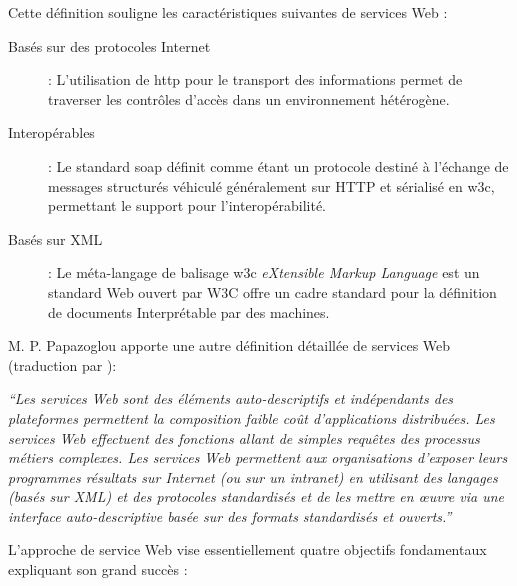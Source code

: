   Cette définition souligne les caractéristiques suivantes de services
  Web \cite{fremantle2002enterprise}:

  \renewcommand{\descriptionlabel}[1]{\hspace{0.5cm}\textbullet~\textsf{#1}}
  \begin{description}
  \item[Basés sur des protocoles Internet]: L'utilisation de
    \acrshort{http} pour le transport des informations permet de
    traverser les contrôles d'accès dans un environnement hétérogène.

  \item[Interopérables]: Le standard \acrshort{soap}
    \cite{box2000simple} définit comme étant un protocole destiné à
    l'échange de messages structurés véhiculé généralement sur
    \textsc{HTTP} et sérialisé en \acrshort{w3c}, permettant le
    support pour l'interopérabilité.

  \item[Basés sur XML] : Le méta-langage de balisage \acrshort{w3c}
    \textit{eXtensible Markup Language} est un standard Web ouvert par
    \textsc{W3C} \cite{bray1998extensible} offre un cadre standard
    pour la définition de documents Interprétable par des machines.
  \end{description}
  \enddescription

  M. P. Papazoglou \cite{papazoglou2003service} apporte une autre
  définition détaillée de services Web (traduction par
  \cite{driss2011approche}):

  \textit{``Les services Web sont des éléments auto-descriptifs et
    indépendants des plateformes permettent la composition faible coût
    d’applications distribuées. Les services Web effectuent des
    fonctions allant de simples requêtes des processus métiers
    complexes. Les services Web permettent aux organisations d'exposer
    leurs programmes résultats sur Internet (ou sur un intranet) en
    utilisant des langages (basés sur XML) et des protocoles
    standardisés et de les mettre en œuvre via une interface
    auto-descriptive basée sur des formats standardisés et ouverts.''}

  L'approche de service Web vise essentiellement quatre objectifs
  fondamentaux expliquant son grand succès \cite{driss2011approche}:

